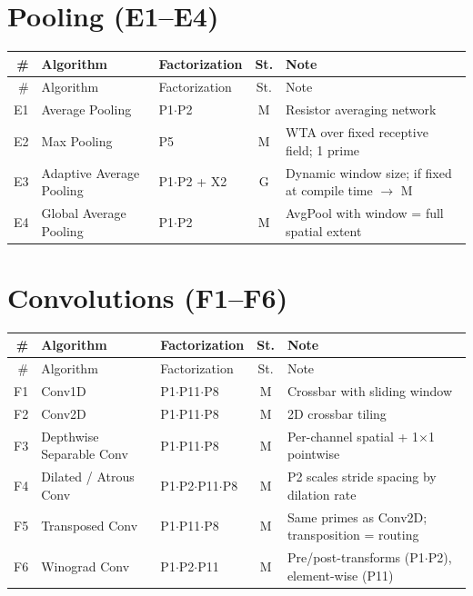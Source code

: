 \documentclass[10pt]{article}
\begin{document}
\section{Pooling (E1--E4)}

\begin{longtable}{rlp{3.0cm}cp{4.8cm}}
\toprule
\# & Algorithm & Factorization & St. & Note \\
\midrule
\endfirsthead
\toprule
\# & Algorithm & Factorization & St. & Note \\
\midrule
\endhead
\bottomrule
\endfoot
E1 & Average Pooling & P1$\cdot$P2 & M & Resistor averaging network \\
E2 & Max Pooling & P5 & M & WTA over fixed receptive field; 1 prime \\
E3 & Adaptive Average Pooling & P1$\cdot$P2 + X2 & G & Dynamic window size; if fixed at compile time $\to$ M \\
E4 & Global Average Pooling & P1$\cdot$P2 & M & AvgPool with window = full spatial extent \\
\end{longtable}

\section{Convolutions (F1--F6)}

\begin{longtable}{rlp{3.0cm}cp{4.8cm}}
\toprule
\# & Algorithm & Factorization & St. & Note \\
\midrule
\endfirsthead
\toprule
\# & Algorithm & Factorization & St. & Note \\
\midrule
\endhead
\bottomrule
\endfoot
F1 & Conv1D & P1$\cdot$P11$\cdot$P8 & M & Crossbar with sliding window \\
F2 & Conv2D & P1$\cdot$P11$\cdot$P8 & M & 2D crossbar tiling \\
F3 & Depthwise Separable Conv & P1$\cdot$P11$\cdot$P8 & M & Per-channel spatial + 1$\times$1 pointwise \\
F4 & Dilated / Atrous Conv & P1$\cdot$P2$\cdot$P11$\cdot$P8 & M & P2 scales stride spacing by dilation rate \\
F5 & Transposed Conv & P1$\cdot$P11$\cdot$P8 & M & Same primes as Conv2D; transposition = routing \\
F6 & Winograd Conv & P1$\cdot$P2$\cdot$P11 & M & Pre/post-transforms (P1$\cdot$P2), element-wise (P11) \\
\end{longtable}
\end{document}
